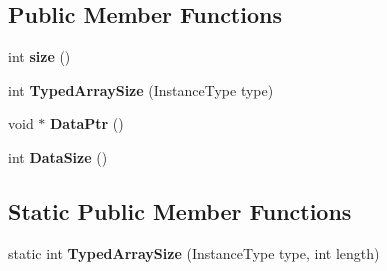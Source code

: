 \subsection*{Public Member Functions}
\begin{DoxyCompactItemize}
\item 
int {\bfseries size} ()\hypertarget{classv8_1_1internal_1_1_fixed_typed_array_base_a8654be3c7948a5128d0747d9afc7d7a4}{}\label{classv8_1_1internal_1_1_fixed_typed_array_base_a8654be3c7948a5128d0747d9afc7d7a4}

\item 
int {\bfseries Typed\+Array\+Size} (Instance\+Type type)\hypertarget{classv8_1_1internal_1_1_fixed_typed_array_base_abeba9a1a849eed61d781b68734a1bcd1}{}\label{classv8_1_1internal_1_1_fixed_typed_array_base_abeba9a1a849eed61d781b68734a1bcd1}

\item 
void $\ast$ {\bfseries Data\+Ptr} ()\hypertarget{classv8_1_1internal_1_1_fixed_typed_array_base_aee400ef42723b06367f5daf53bbcf89e}{}\label{classv8_1_1internal_1_1_fixed_typed_array_base_aee400ef42723b06367f5daf53bbcf89e}

\item 
int {\bfseries Data\+Size} ()\hypertarget{classv8_1_1internal_1_1_fixed_typed_array_base_a1f6f417d9de199d53788cbde53da222c}{}\label{classv8_1_1internal_1_1_fixed_typed_array_base_a1f6f417d9de199d53788cbde53da222c}

\end{DoxyCompactItemize}
\subsection*{Static Public Member Functions}
\begin{DoxyCompactItemize}
\item 
static int {\bfseries Typed\+Array\+Size} (Instance\+Type type, int length)\hypertarget{classv8_1_1internal_1_1_fixed_typed_array_base_aa4c69146e3ff4c6f0816dc13789d342e}{}\label{classv8_1_1internal_1_1_fixed_typed_array_base_aa4c69146e3ff4c6f0816dc13789d342e}

\end{DoxyCompactItemize}
